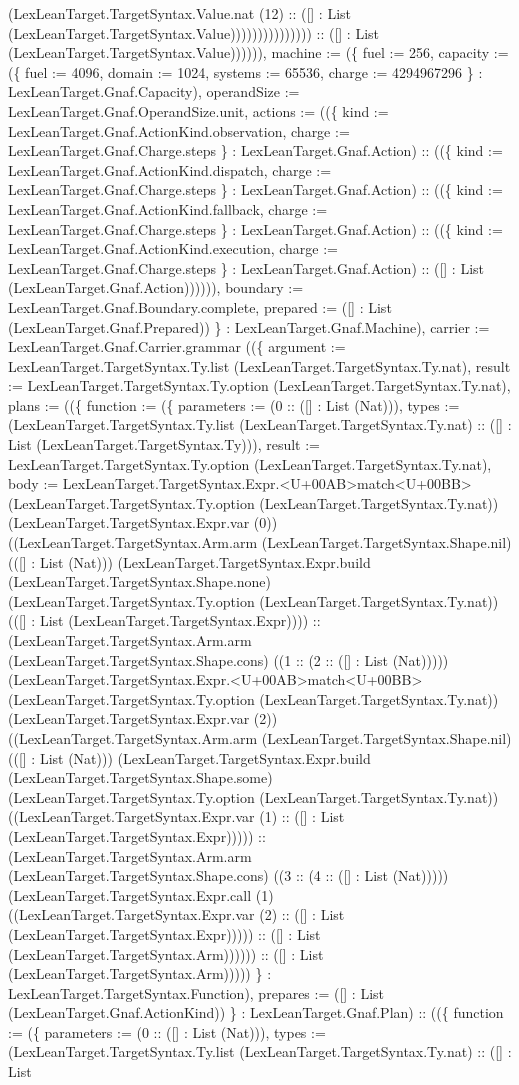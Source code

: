 \documentclass[11pt]{article}
\begin{document}
(LexLeanTarget.TargetSyntax.Value.nat (12) :: ([] : List (LexLeanTarget.TargetSyntax.Value))))))))))))))) :: ([] : List (LexLeanTarget.TargetSyntax.Value)))))), machine := (\{ fuel := 256, capacity := (\{ fuel := 4096, domain := 1024, systems := 65536, charge := 4294967296 \} : LexLeanTarget.Gnaf.Capacity), operandSize := LexLeanTarget.Gnaf.OperandSize.unit, actions := ((\{ kind := LexLeanTarget.Gnaf.ActionKind.observation, charge := LexLeanTarget.Gnaf.Charge.steps \} : LexLeanTarget.Gnaf.Action) :: ((\{ kind := LexLeanTarget.Gnaf.ActionKind.dispatch, charge := LexLeanTarget.Gnaf.Charge.steps \} : LexLeanTarget.Gnaf.Action) :: ((\{ kind := LexLeanTarget.Gnaf.ActionKind.fallback, charge := LexLeanTarget.Gnaf.Charge.steps \} : LexLeanTarget.Gnaf.Action) :: ((\{ kind := LexLeanTarget.Gnaf.ActionKind.execution, charge := LexLeanTarget.Gnaf.Charge.steps \} : LexLeanTarget.Gnaf.Action) :: ([] : List (LexLeanTarget.Gnaf.Action)))))), boundary := LexLeanTarget.Gnaf.Boundary.complete, prepared := ([] : List (LexLeanTarget.Gnaf.Prepared)) \} : LexLeanTarget.Gnaf.Machine), carrier := LexLeanTarget.Gnaf.Carrier.grammar ((\{ argument := LexLeanTarget.TargetSyntax.Ty.list (LexLeanTarget.TargetSyntax.Ty.nat), result := LexLeanTarget.TargetSyntax.Ty.option (LexLeanTarget.TargetSyntax.Ty.nat), plans := ((\{ function := (\{ parameters := (0 :: ([] : List (Nat))), types := (LexLeanTarget.TargetSyntax.Ty.list (LexLeanTarget.TargetSyntax.Ty.nat) :: ([] : List (LexLeanTarget.TargetSyntax.Ty))), result := LexLeanTarget.TargetSyntax.Ty.option (LexLeanTarget.TargetSyntax.Ty.nat), body := LexLeanTarget.TargetSyntax.Expr.<U+00AB>match<U+00BB> (LexLeanTarget.TargetSyntax.Ty.option (LexLeanTarget.TargetSyntax.Ty.nat)) (LexLeanTarget.TargetSyntax.Expr.var (0)) ((LexLeanTarget.TargetSyntax.Arm.arm (LexLeanTarget.TargetSyntax.Shape.nil) (([] : List (Nat))) (LexLeanTarget.TargetSyntax.Expr.build (LexLeanTarget.TargetSyntax.Shape.none) (LexLeanTarget.TargetSyntax.Ty.option (LexLeanTarget.TargetSyntax.Ty.nat)) (([] : List (LexLeanTarget.TargetSyntax.Expr)))) :: (LexLeanTarget.TargetSyntax.Arm.arm (LexLeanTarget.TargetSyntax.Shape.cons) ((1 :: (2 :: ([] : List (Nat))))) (LexLeanTarget.TargetSyntax.Expr.<U+00AB>match<U+00BB> (LexLeanTarget.TargetSyntax.Ty.option (LexLeanTarget.TargetSyntax.Ty.nat)) (LexLeanTarget.TargetSyntax.Expr.var (2)) ((LexLeanTarget.TargetSyntax.Arm.arm (LexLeanTarget.TargetSyntax.Shape.nil) (([] : List (Nat))) (LexLeanTarget.TargetSyntax.Expr.build (LexLeanTarget.TargetSyntax.Shape.some) (LexLeanTarget.TargetSyntax.Ty.option (LexLeanTarget.TargetSyntax.Ty.nat)) ((LexLeanTarget.TargetSyntax.Expr.var (1) :: ([] : List (LexLeanTarget.TargetSyntax.Expr))))) :: (LexLeanTarget.TargetSyntax.Arm.arm (LexLeanTarget.TargetSyntax.Shape.cons) ((3 :: (4 :: ([] : List (Nat))))) (LexLeanTarget.TargetSyntax.Expr.call (1) ((LexLeanTarget.TargetSyntax.Expr.var (2) :: ([] : List (LexLeanTarget.TargetSyntax.Expr))))) :: ([] : List (LexLeanTarget.TargetSyntax.Arm)))))) :: ([] : List (LexLeanTarget.TargetSyntax.Arm))))) \} : LexLeanTarget.TargetSyntax.Function), prepares := ([] : List (LexLeanTarget.Gnaf.ActionKind)) \} : LexLeanTarget.Gnaf.Plan) :: ((\{ function := (\{ parameters := (0 :: ([] : List (Nat))), types := (LexLeanTarget.TargetSyntax.Ty.list (LexLeanTarget.TargetSyntax.Ty.nat) :: ([] : List 
\end{document}

